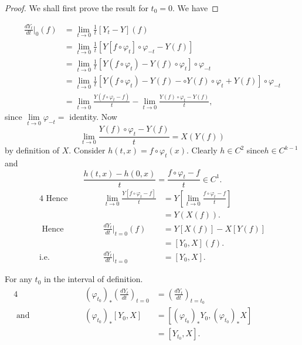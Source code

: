 \begin{proof}
  We shall first prove the result for $t_0 = 0$. We have
\end{proof}

\begin{align*}
  \frac{dY_t}{dt} \bigg|_0 (f) & = \lim_{t \to 0} \frac{1}{t} [Y_t - Y] (f) \\
  & = \lim_{t \to 0} \frac{1}{t} [Y [f \circ \varphi_t ] \circ
    \varphi_{-t} - Y(f)] \\ 
  & = \lim_{t \to 0} \frac{1}{t} [Y(f \circ \varphi_t ) - Y(f) \circ \varphi_t
  ] \circ \varphi_{-t} \\ 
  & = \lim_{t \to 0} \frac{1}{t} [Y(f \circ \varphi_t ) - Y(f) - \circ
    Y(f) \circ \varphi_t + Y (f) ] \circ \varphi_{-t} \\ 
  & = \lim_{t \to 0} \frac{Y (f \circ \varphi_t - f)}{t} - \lim_{t \to 0}
  \frac{Y(f) \circ \varphi_t -Y(f)}{t}, 
\end{align*}
since $\lim \limits_{t \to 0} \varphi_{-t} =$ identity. Now
$$
\lim_{t \to 0} \frac{Y(f) \circ \varphi_t - Y (f)}{t} = X(Y(f))
$$
by definition of $X$. Consider $h(t, x) = f \circ \varphi_t (x)$. Clearly
$h \in C^2$ since\pageoriginale $h \in C^{k-1}$ and 
$$
\frac{h(t, x) - h (0 , x)}{t} = \frac{f \circ \varphi_t - f}{t} \in C^1.
$$
\begin{alignat*}{4}
  \text{ Hence } &\hspace{1cm}&\lim \limits_{t \to 0} \frac{Y [ f \circ \varphi_t -
      f]}{t}&  = Y \left[\lim \limits_{t \to 0} \frac{f \circ \varphi_t -
      f}{t}\right]\\ 
  &&& = Y(X(f)).\\
  \text{ Hence } &&\frac{d Y_t} {dt} \bigg|_{t = 0} (f) & = Y [X (f)]
  - X [Y(f)] \\ 
  &&& = [Y_0 , X] (f). \\
  \text{i.e.}\quad && \frac{dY_t}{dt}\bigg|_{t = 0} & = [Y_0, X].
\end{alignat*}

For any $t_0$ in the interval of definition.
\begin{alignat*}{4}
&&(\varphi_{t_0})_* \left(\frac{dY_t}{dt}\right)_{t =0} & =
\left(\frac{dY_t}{dt}\right)_{t =t_0} \\
  \text{ and }&\hspace{2cm}& (\varphi_{t_0})_* [Y_0, X] & =
       [(\varphi_{t_0})_* Y_0, (\varphi_{t_0})_* X] \hspace{2cm}\\ 
 && & = [Y_{t_0}, X]. 
\end{alignat*}

